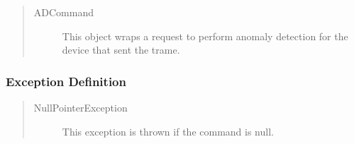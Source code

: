 \begin{quote}
	\begin{description}
		\item[ADCommand] This object wraps a request to perform anomaly detection for
		the device that sent the trame.	
	\end{description} 
\end{quote}

\subsubsection{Exception Definition}

\begin{quote}
	\begin{description}
		\item[NullPointerException] This exception is thrown if the command is null.
	\end{description} 
\end{quote}